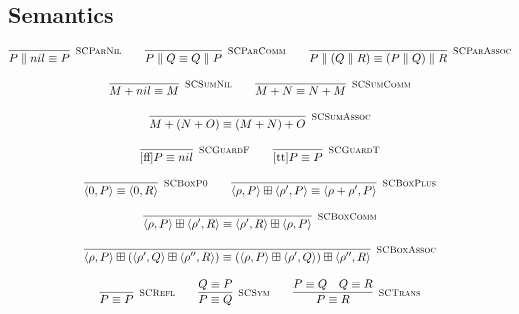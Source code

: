 
\subsection{Semantics}
	\begin{gather*}
    \infer[\mbox{\footnotesize\scshape SCParNil}]{P \parallel nil \equiv P}{} \qquad
    \infer[\mbox{\footnotesize\scshape SCParComm}]{P \parallel Q \equiv Q \parallel P}{} \qquad
    \infer[\mbox{\footnotesize\scshape SCParAssoc}]{P \parallel (Q \parallel R) \equiv (P \parallel Q) \parallel R}{} \\[0.3cm]
    \infer[\mbox{\footnotesize\scshape SCSumNil}]{M + nil \equiv M}{} \qquad
    \infer[\mbox{\footnotesize\scshape SCSumComm}]{M + N \equiv N + M}{} \\[0.3cm]
    \infer[\mbox{\footnotesize\scshape SCSumAssoc}]{M + (N + O) \equiv (M + N) + O}{} \\[0.3cm]
    \infer[\mbox{\footnotesize\scshape SCGuardF}]{[\text{ff}]P \equiv nil}{} \qquad
    \infer[\mbox{\footnotesize\scshape SCGuardT}]{[\text{tt}]P \equiv P}{} \\[0.3cm]
    \infer[\mbox{\footnotesize\scshape SCBoxP0}]{\langle 0, P \rangle \equiv \langle 0, R \rangle}{} \qquad
    \infer[\mbox{\footnotesize\scshape SCBoxPlus}]{\langle \rho, P \rangle \boxplus \langle \rho', P \rangle \equiv \langle \rho + \rho', P \rangle}{} \\[0.3cm]
    \infer[\mbox{\footnotesize\scshape SCBoxComm}]{\langle \rho, P \rangle \boxplus \langle \rho', R \rangle \equiv \langle \rho', R \rangle \boxplus \langle \rho, P \rangle}{} \\[0.3cm]
    \infer[\mbox{\footnotesize\scshape SCBoxAssoc}]{\langle \rho, P \rangle \boxplus (\langle \rho', Q \rangle \boxplus \langle \rho'', R \rangle) \equiv (\langle \rho, P \rangle \boxplus \langle \rho', Q \rangle) \boxplus \langle \rho'', R \rangle}{} \\[0.3cm]
    \infer[\mbox{\footnotesize\scshape SCRefl}]{P \equiv P}{} \qquad
    \infer[\mbox{\footnotesize\scshape SCSym}]{P \equiv Q}{Q \equiv P} \qquad
    \infer[\mbox{\footnotesize\scshape SCTrans}]{P \equiv R}{P \equiv Q & Q \equiv R} \\[0.3cm]
	\end{gather*}	

